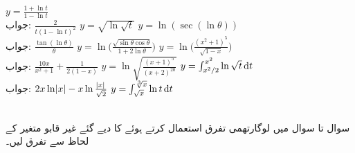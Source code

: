 $y=\frac{1+\ln t}{1-\ln t}$\\
جواب:\quad
$\tfrac{2}{t(1-\ln t)^2}$
$y=\sqrt{\ln\sqrt{t}}$
$y=\ln(\sec(\ln\theta))$\\
جواب:\quad
$\tfrac{\tan(\ln\theta)}{\theta}$
$y=\ln\big(\frac{\sqrt{\sin\theta\cos\theta}}{1+2\ln\theta}\big)$
$y=\ln\big(\frac{(x^2+1)^5}{\sqrt{1-x}}\big)$\\
جواب:\quad
$\tfrac{10x}{x^2+1}+\tfrac{1}{2(1-x)}$
$y=\ln\sqrt{\frac{(x+1)^5}{(x+2)^{20}}}$
$y=\int_{x^2/2}^{x^2}\ln\sqrt{t}\dif t$\\
جواب:\quad
$2x\ln\abs{x}-x\ln\tfrac{\abs{x}}{\sqrt{2}}$
$y=\int_{\sqrt{x}}^{\sqrt[3]{x}}\ln t\dif t$

\\
سوال  تا سوال  میں لوگارتھمی تفرق استعمال کرتے ہوئے  کا دیے گئے غیر قابو متغیر کے لحاظ سے تفرق لیں۔

